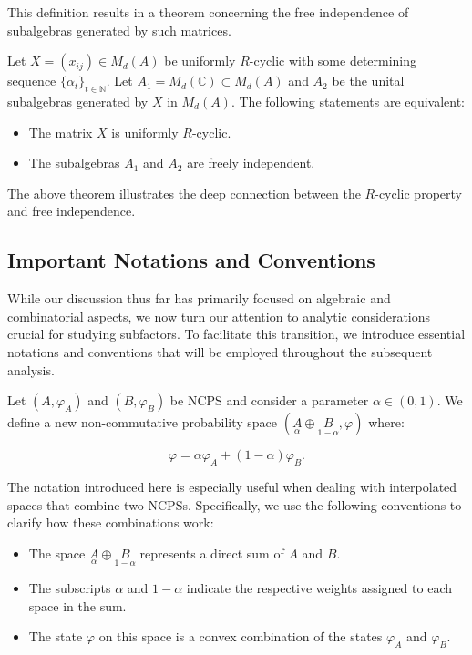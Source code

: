 This definition results in a theorem concerning the free independence of subalgebras generated by such matrices.

\begin{theorem}\label{rcyclicfreeness}
Let $X = (x_{ij}) \in M_d(A)$ be uniformly $R$-cyclic with some determining sequence $\{\alpha_t\}_{t \in \mathbb{N}}$. Let $A_1= M_d(\mathbb{C})\subset M_d(A) $ and $A_2$ be the unital subalgebras generated by $X$ in $M_d(A)$. The following statements are equivalent:
\begin{itemize}
    \item The matrix $X$ is uniformly $R$-cyclic.
    \item The subalgebras $A_1$ and $A_2$ are freely independent.
\end{itemize}
\end{theorem}

The above theorem illustrates the deep connection between the $R$-cyclic property and free independence.


\subsection*{Important Notations and Conventions}

While our discussion thus far has primarily focused on algebraic and combinatorial aspects, we now turn our attention to analytic considerations crucial for studying subfactors. To facilitate this transition, we introduce essential notations and conventions that will be employed throughout the subsequent analysis.

Let $(A, \varphi_A)$ and $(B, \varphi_B)$ be NCPS and consider a parameter $\alpha \in (0,1)$. We define a new non-commutative probability space $(\underset{\alpha}{A} \oplus \underset{1-\alpha}{B}, \varphi)$ where:

\[
\varphi = \alpha \varphi_A + (1 - \alpha) \varphi_B.
\]

The notation introduced here is especially useful when dealing with interpolated spaces that combine two NCPSs. Specifically, we use the following conventions to clarify how these combinations work:

\begin{itemize}
    \item The space $\underset{\alpha}{A} \oplus \underset{1-\alpha}{B}$ represents a direct sum of $A$ and $B$.
    \item The subscripts $\alpha$ and $1-\alpha$ indicate the respective weights assigned to each space in the sum.
    \item The state $\varphi$ on this space is a convex combination of the states $\varphi_A$ and $\varphi_B$.
\end{itemize}

